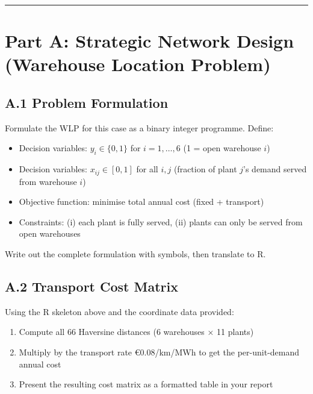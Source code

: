 \documentclass[
  a4paper,
]{article}
\providecommand{\tightlist}{%
  \setlength{\itemsep}{0pt}\setlength{\parskip}{0pt}}
\begin{document}
\begin{center}\rule{0.5\linewidth}{0.5pt}\end{center}

\section{Part A: Strategic Network Design (Warehouse Location
Problem)}\label{part-a-strategic-network-design-warehouse-location-problem}

\subsection{A.1 Problem Formulation}\label{a.1-problem-formulation}

Formulate the WLP for this case as a binary integer programme. Define:

\begin{itemize}
\tightlist
\item
  Decision variables: \(y_i \in \{0,1\}\) for \(i = 1, \ldots, 6\) (1 =
  open warehouse \(i\))
\item
  Decision variables: \(x_{ij} \in [0,1]\) for all \(i, j\) (fraction of
  plant \(j\)'s demand served from warehouse \(i\))
\item
  Objective function: minimise total annual cost (fixed + transport)
\item
  Constraints: (i) each plant is fully served, (ii) plants can only be
  served from open warehouses
\end{itemize}

Write out the complete formulation with symbols, then translate to R.

\subsection{A.2 Transport Cost Matrix}\label{a.2-transport-cost-matrix}

Using the R skeleton above and the coordinate data provided:

\begin{enumerate}
\def\labelenumi{\arabic{enumi}.}
\tightlist
\item
  Compute all 66 Haversine distances (6 warehouses × 11 plants)
\item
  Multiply by the transport rate €0.08/km/MWh to get the per-unit-demand
  annual cost
\item
  Present the resulting cost matrix as a formatted table in your report
\end{enumerate}
\end{document}
